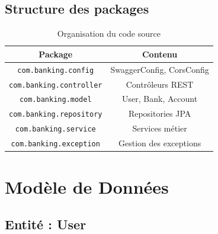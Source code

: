 \documentclass[12pt,a4paper]{article}
\newcommand{\tableheader}[1]{\textbf{#1}}
\begin{document}
\subsection{Structure des packages}

\begin{table}[H]
    \centering
    \renewcommand{\arraystretch}{1.3}
    \begin{tabular}{|c|c|}
        \hline
        \tableheader{Package} & \tableheader{Contenu} \\
        \hline
        \texttt{com.banking.config} & SwaggerConfig, CorsConfig \\
        \hline
        \texttt{com.banking.controller} & Contrôleurs REST \\
        \hline
        \texttt{com.banking.model} & User, Bank, Account \\
        \hline
        \texttt{com.banking.repository} & Repositories JPA \\
        \hline
        \texttt{com.banking.service} & Services métier \\
        \hline
        \texttt{com.banking.exception} & Gestion des exceptions \\
        \hline
    \end{tabular}
    \caption{Organisation du code source}
\end{table}

\section{Modèle de Données}

\subsection{Entité : User}
\end{document}
